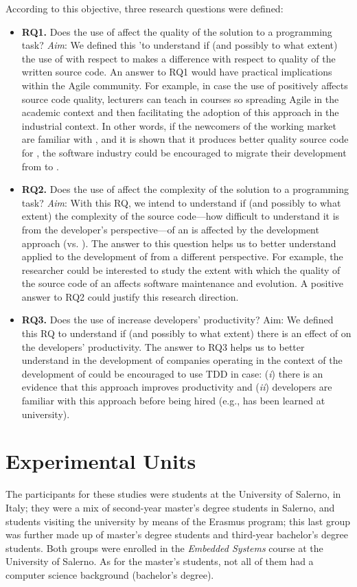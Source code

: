 According to this objective, three research questions were defined:
\begin{itemize}
    \item \textbf{RQ1.} Does the use of \tdd affect the quality of the solution to a programming task? 
    \textit{Aim}: We defined this \rq to understand if (and possibly to what extent) the use of \tdd with respect to \yw makes a difference with respect to quality of the written source code. An answer to RQ1 would have practical implications within the Agile community. For example, in case the use of \tdd positively affects source code quality, lecturers can teach \tdd in \es courses so spreading Agile in the academic context and then facilitating the adoption of this approach in the industrial context. In other words, if the newcomers of the working market are familiar with \tdd, and it is shown that it produces better quality source code for \ess, the software industry could be encouraged to migrate their development from \yw to \tdd.
    \item \textbf{RQ2.} Does the use of \tdd affect the complexity of the solution to a programming task?
    \textit{Aim}: With this RQ, we intend to understand if (and possibly to what extent) the complexity of the source code—how difficult to understand it is from the developer's perspective—of an \es is affected by the development approach (\tdd vs. \yw). The answer to this question helps us to better understand \tdd applied to the development of \ess from a different perspective. For example, the researcher could be interested to study the extent with which the quality of the source code of an \es affects software maintenance and evolution. A positive answer to RQ2 could justify this research direction.
    \item \textbf{RQ3.} Does the use of \tdd increase developers' productivity?
    Aim: We defined this RQ to understand if (and possibly to what extent) there is an effect of \tdd on the developers’ productivity. The answer to RQ3 helps us to better understand \tdd in the development of \ess companies operating in the context of the development of \ess could be encouraged to use TDD in case: (\textit{i}) there is an evidence that this approach improves productivity and (\textit{ii}) developers are familiar with this approach before being hired (e.g., \tdd has been learned at university).
\end{itemize}



\section{Experimental Units}
The participants for these studies were students at the University of Salerno, in Italy; they were a mix of second-year master's degree students in Salerno, and students visiting the university by means of the Erasmus program; this last group was further made up of master's degree students and third-year bachelor's degree students. Both groups were enrolled in the \textit{Embedded Systems} course at the University of Salerno. As for the master's students, not all of them had a computer science background (bachelor's degree).

